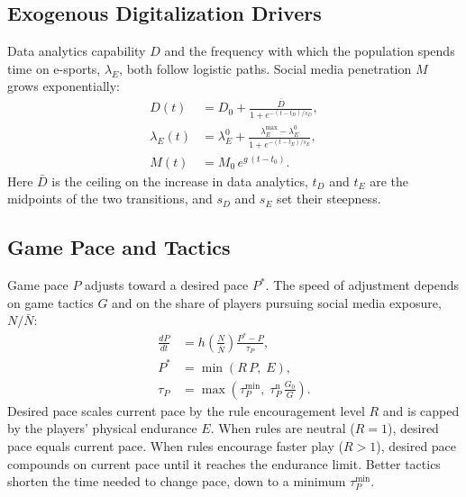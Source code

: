 
\subsection{Exogenous Digitalization Drivers}
\label{sec:model:exogenous}

Data analytics capability $D$ and the frequency with which the
population spends time on e-sports, $\lambda_E$, both follow logistic
paths. Social media penetration $M$ grows exponentially:
\begin{align}
  D(t) &= D_0 + \frac{\bar{D}}{1 + e^{-(t - t_D)/s_D}},
  \label{eq:D}\\[4pt]
  \lambda_E(t) &= \lambda_E^{0}
     + \frac{\lambda_E^{\max} - \lambda_E^{0}}{1 + e^{-(t - t_E)/s_E}},
  \label{eq:lambdaE}\\[4pt]
  M(t) &= M_0\, e^{g\,(t - t_0)}.
  \label{eq:M}
\end{align}
Here $\bar{D}$ is the ceiling on the increase in data analytics,
$t_D$ and $t_E$ are the midpoints of the two transitions, and $s_D$
and $s_E$ set their steepness.


\subsection{Game Pace and Tactics}
\label{sec:model:pace}

Game pace $P$ adjusts toward a desired pace $P^{*}$. The speed of
adjustment depends on game tactics $G$ and on the share of players
pursuing social media exposure, $N/\bar{N}$:
\begin{align}
  \frac{dP}{dt} &= h\!\left(\frac{N}{\bar{N}}\right)
                   \frac{P^{*} - P}{\tau_P},
  \label{eq:P}\\[4pt]
  P^{*} &= \min\left( R\,P,\; E \right),
  \label{eq:Pstar}\\[4pt]
  \tau_P &= \max\left( \tau_P^{\min},\;
            \tau_P^{\mathrm{n}}\,\frac{G_0}{G} \right).
  \label{eq:tauP}
\end{align}
Desired pace scales current pace by the rule encouragement level $R$
and is capped by the players' physical endurance $E$. When rules are
neutral ($R = 1$), desired pace equals current pace. When rules
encourage faster play ($R > 1$), desired pace compounds on current pace
until it reaches the endurance limit. Better tactics shorten the time
needed to change pace, down to a minimum $\tau_P^{\min}$.

